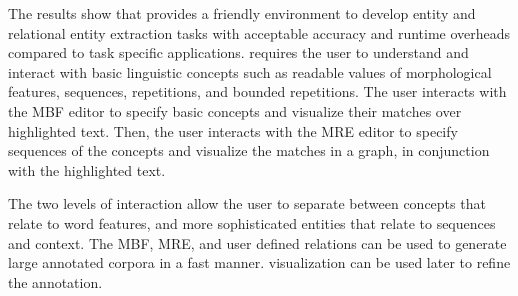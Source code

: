 The results show that \framework 
provides a friendly environment to develop entity and relational
entity extraction tasks with acceptable 
accuracy and runtime overheads compared to task specific applications. 
%
\framework requires the user to understand and interact with 
basic linguistic concepts such as readable values of morphological 
features, sequences, repetitions, and bounded repetitions. 
The user interacts with the MBF editor to specify basic concepts
and visualize their matches over highlighted text. 
%
Then, the user interacts with the MRE editor to specify 
sequences of the concepts and visualize the matches
in a graph, in conjunction with the highlighted text.

The two levels of interaction allow the user to separate between concepts 
that relate to word features, and more sophisticated entities 
that relate to sequences and context. 
%
The MBF, MRE, and user defined relations 
can be used to generate large annotated corpora in a fast manner. 
\framework visualization can be used later to refine the annotation.
%

